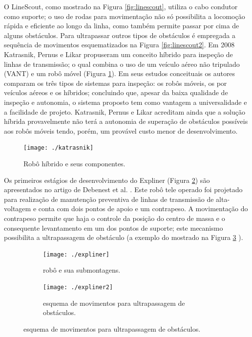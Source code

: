 O LineScout, como mostrado na Figura \ref{fig:linescout}, utiliza o cabo condutor como suporte; o uso de rodas para movimentação não só possibilita a locomoção rápida e eficiente ao longo da linha, como também permite passar por cima de alguns obstáculos. Para ultrapassar outros tipos de obstáculos é empregada a sequência de movimentos esquematizados na Figura \ref{fig:linescout2}.
Em 2008 Katrasnik, Pernus e Likar \cite{katrasnik2010climbing} propuseram um conceito híbrido para inspeção de linhas de transmissão; o qual combina o uso de um veículo aéreo não tripulado (VANT) e um robô móvel (Figura \ref{img:katrasnik}). Em seus estudos conceituais os autores comparam os três tipos de sistemas para inspeção: os robôs móveis, os por veículos aéreos e os híbridos; concluindo que, apesar da baixa qualidade de inspeção e autonomia, o sistema proposto tem como vantagem a universalidade e a facilidade de projeto.  Katrasnik, Pernus e Likar \cite{katrasnik2010climbing} acreditam ainda que a solução híbrida provavelmente não terá a autonomia de superação de obstáculos possíveis aos robôs móveis tendo, porém, um provável custo menor de desenvolvimento.  

\begin{figure}[h!]	
	\caption{Robô híbrido e seus componentes.}
	\label{img:katrasnik}											 
	\centering													 
	\texttt{[image: ./katrasnik]}
\end{figure}													 

Os primeiros estágios de desenvolvimento do Expliner (Figura \ref{img:expliner1}) são apresentados no artigo de Debenest et al. \cite{debenest2008expliner}. Este robô tele operado foi projetado para realização de manutenção preventiva de linhas de transmissão de alta-voltagem e conta com dois pontos de apoio e um contrapeso.  A movimentação do contrapeso permite que haja o controle da posição do centro de massa e o consequente levantamento em um dos pontos de suporte; este mecanismo possibilita a ultrapassagem de obstáculo (a exemplo do mostrado na Figura \ref{img:expliner2} ).

\begin{figure}[h!]
		\caption{Robô Expliner.}
		\begin{subfigure}[b]{0.5\textwidth}
		  	\centering
		  	\texttt{[image: ./expliner]} 
		  	\caption{robô e sua submontagens.}
		  	\label{img:expliner1}
		\end{subfigure}
		\begin{subfigure}[b]{0.5\textwidth}
		  	\centering
		  	\texttt{[image: ./expliner2]} 
		  	\caption{esquema de movimentos para ultrapassagem de obstáculos.}
		  	\label{img:expliner2}
		\end{subfigure} 
	  \label{img:expliner}
\end{figure}

